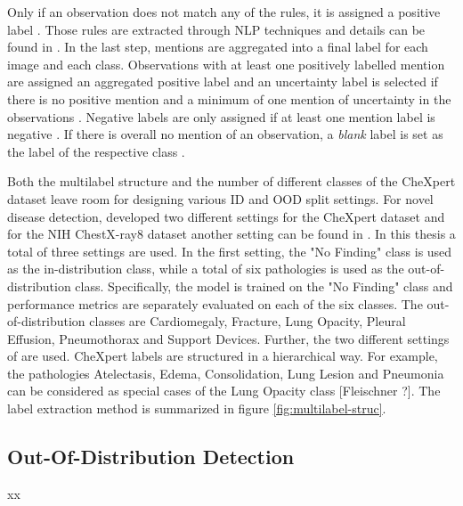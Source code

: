 Only if an observation does not match any of the rules, it is assigned a positive label \citep{Irvin2019}.
Those rules are extracted through NLP techniques and details can be found in \citep{Irvin2019}.
In the last step, mentions are aggregated into a final label for each image and each class.
Observations with at least one positively labelled mention are assigned an aggregated positive label and an uncertainty label is selected if there is no positive mention and a minimum of one mention of uncertainty in the observations \citep{Irvin2019}.
Negative labels are only assigned if at least one mention label is negative \citep{Irvin2019}. 
If there is overall no mention of an observation, a \textit{blank} label is set as the label of the respective class \citep{Irvin2019}.
\par
Both the multilabel structure and the number of different classes of the CheXpert dataset leave room for designing various ID and OOD split settings.
For novel disease detection, \citep{Berger2021} developed two different settings for the CheXpert dataset and for the NIH ChestX-ray8 dataset \citep{Wang2017} another setting can be found in \citep{Cao2020}.
In this thesis a total of three settings are used.
In the first setting, the "No Finding" class is used as the in-distribution class, while a total of six pathologies is used as the out-of-distribution class.
Specifically, the model is trained on the "No Finding" class and performance metrics are separately evaluated on each of the six classes.
The out-of-distribution classes are Cardiomegaly, Fracture, Lung Opacity, Pleural Effusion, Pneumothorax and Support Devices.
Further, the two different settings of \citep{Berger2021} are used.
CheXpert labels are structured in a hierarchical way.
For example, the pathologies Atelectasis, Edema, Consolidation, Lung Lesion and Pneumonia can be considered as special cases of the Lung Opacity class [Fleischner ?].
The label extraction method is summarized in figure \ref{fig:multilabel-struc}.

\subsection{Out-Of-Distribution Detection}
xx

